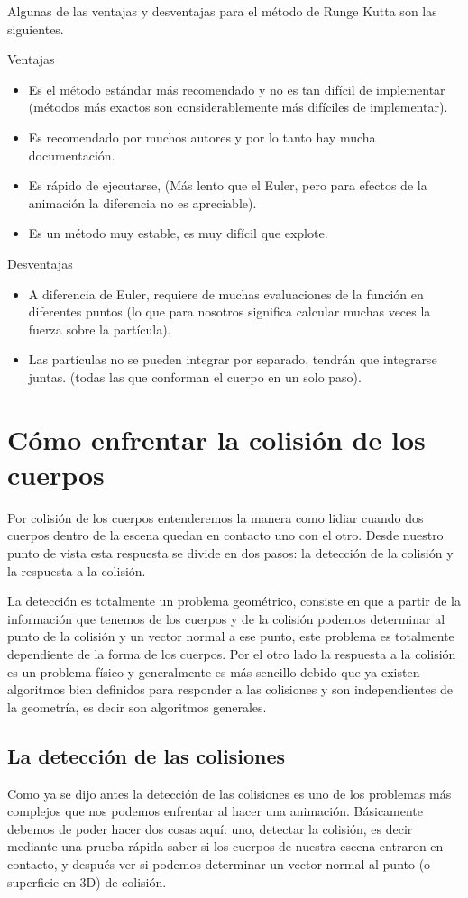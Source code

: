 Algunas de las ventajas y desventajas para el método de Runge Kutta son las siguientes.

Ventajas
\begin{itemize}
\item Es el método estándar más recomendado y no es tan difícil de implementar (métodos más exactos son considerablemente más difíciles de implementar).
\item Es recomendado por muchos autores y por lo tanto hay mucha documentación.
\item Es rápido de ejecutarse, (Más lento que el Euler, pero para efectos de la animación la diferencia no es apreciable).
\item Es un método muy estable, es muy difícil que explote.
\end{itemize}

Desventajas
\begin{itemize}
\item A diferencia de Euler, requiere de muchas evaluaciones de la función en diferentes puntos (lo que para nosotros significa calcular muchas veces la fuerza sobre la partícula).
\item Las partículas no se pueden integrar por separado, tendrán que integrarse juntas. (todas las que conforman el cuerpo en un solo paso).
\end{itemize}

\section{Cómo enfrentar la colisión de los cuerpos}
Por colisión de los cuerpos entenderemos la manera como lidiar cuando dos cuerpos dentro de la escena quedan en contacto uno con el otro.
Desde nuestro punto de vista esta respuesta se divide en dos pasos: la detección de la colisión y la respuesta a la colisión.

La detección es totalmente un problema geométrico, consiste en que a partir de la información que tenemos de los cuerpos y de la colisión podemos determinar al punto de la colisión y un vector normal a ese punto, este problema es totalmente dependiente de la forma de los cuerpos.
Por el otro lado la respuesta a la colisión es un problema físico y generalmente es más sencillo debido que ya existen algoritmos bien definidos para responder a las colisiones y son independientes de la geometría, es decir son algoritmos generales.

\subsection{La detección de las colisiones}
Como ya se dijo antes la detección de las colisiones es uno de los problemas más complejos que nos podemos enfrentar al hacer una animación.
Básicamente debemos de poder hacer dos cosas aquí: uno, detectar la colisión, es decir mediante una prueba rápida saber si los cuerpos de nuestra escena entraron en contacto, y después ver si podemos determinar un vector normal al punto (o superficie en 3D) de colisión.

